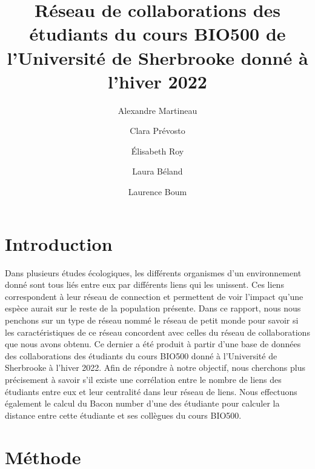 \documentclass[9pt,twocolumn,twoside,]{pnas-new}
\title{Réseau de collaborations des étudiants du cours BIO500 de
l'Université de Sherbrooke donné à l'hiver 2022}
\author[a]{Alexandre Martineau}
\author[a]{Clara Prévosto}
\author[a]{Élisabeth Roy}
\author[a]{Laura Béland}
\author[a]{Laurence Boum}
\affil[a]{Université de Sherbrooke, Départment de biologie, 2500
Boulevard de l'Université, Sherbrooke, Québec, J1K 2R1}
\begin{document}
\verticaladjustment{-2pt}



\maketitle
\thispagestyle{firststyle}


\acknow{}

\hypertarget{introduction}{%
\section{Introduction}\label{introduction}}

Dans plusieurs études écologiques, les différents organismes d'un
environnement donné sont tous liés entre eux par différents liens qui
les unissent. Ces liens correspondent à leur réseau de connection et
permettent de voir l'impact qu'une espèce aurait sur le reste de la
population présente. Dans ce rapport, nous nous penchons sur un type de
réseau nommé le réseau de petit monde pour savoir si les
caractéristiques de ce réseau concordent avec celles du réseau de
collaborations que nous avons obtenu. Ce dernier a été produit à partir
d'une base de données des collaborations des étudiants du cours BIO500
donné à l'Université de Sherbrooke à l'hiver 2022. Afin de répondre à
notre objectif, nous cherchons plus précisement à savoir s'il existe une
corrélation entre le nombre de liens des étudiants entre eux et leur
centralité dans leur réseau de liens. Nous effectuons également le
calcul du Bacon number d'une des étudiante pour calculer la distance
entre cette étudiante et ses collègues du cours BIO500.

\hypertarget{muxe9thode}{%
\section{Méthode}\label{muxe9thode}}
\end{document}
